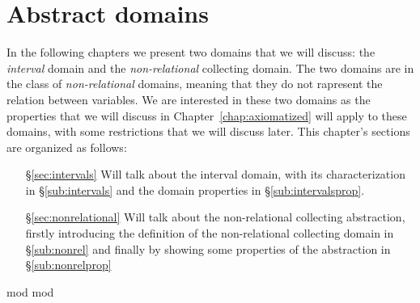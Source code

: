 \chapter{Abstract domains}
\label{chap:abstractdomains}


In the following chapters we present two domains that we will discuss:
the \emph{interval} domain and the \emph{non-relational} collecting
domain. The two domains are in the class of \emph{non-relational}
domains, meaning that they do not rapresent the relation between
variables.  We are interested in these two domains as the
properties that we will discuss in Chapter~\ref{chap:axiomatized} will
apply to these domains, with some restrictions that we will discuss
later.  This chapter's sections are organized as follows:

\begin{itemize}
\item[\S\ref{sec:intervals}] Will talk about the interval domain, with
  its characterization in \S\ref{sub:intervals} and the domain
  properties in \S\ref{sub:intervalsprop}.
\item[\S\ref{sec:nonrelational}] Will talk about the non-relational
  collecting abstraction, firstly introducing the definition of the
  non-relational collecting domain in \S\ref{sub:nonrel} and finally
  by showing some properties of the abstraction in
  \S\ref{sub:nonrelprop}
\end{itemize}

{mod}
{mod}

